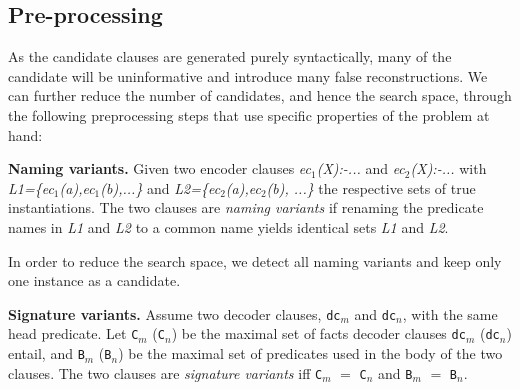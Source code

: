 \subsection{Pre-processing}
As the candidate clauses are generated purely syntactically, many of the candidate will be uninformative and introduce many false reconstructions.
We can further reduce the number of candidates, and hence the search space, through the following preprocessing steps that use specific properties of the problem at hand:

\begin{definition}
\textbf{Naming variants.}
Given two encoder clauses \textit{ec$_1$(X):\!-...}
and \textit{ec$_2$(X):\!-...}
with \textit{L1=\{ec$_1$(a),ec$_1$(b),...\}} and \textit{L2=\{ec$_2$(a),ec$_2$(b), ...\}} the respective sets of true instantiations.
The two clauses are \textit{naming variants} if renaming the predicate names in \textit{L1} and \textit{L2} to a common name yields identical sets \textit{L1} and \textit{L2}.
\end{definition}




In order to reduce the search space, we detect all naming variants and keep only one instance as a candidate.


\begin{definition}
\textbf{Signature variants.}
Assume two decoder clauses, \texttt{dc}$_m$ and \texttt{dc}$_n$, with the same head predicate.
Let \texttt{C}$_m$ (\texttt{C}$_n$) be the maximal set of facts decoder clauses \texttt{dc}$_m$ (\texttt{dc}$_n$) entail, and \texttt{B}$_m$ (\texttt{B}$_n$) be the maximal set of predicates used in the body of the two clauses.
The two clauses are \textit{signature variants} iff \texttt{C}$_m$ $=$ \texttt{C}$_n$ and \texttt{B$_m$} $=$ \texttt{B$_n$}.
\end{definition}

